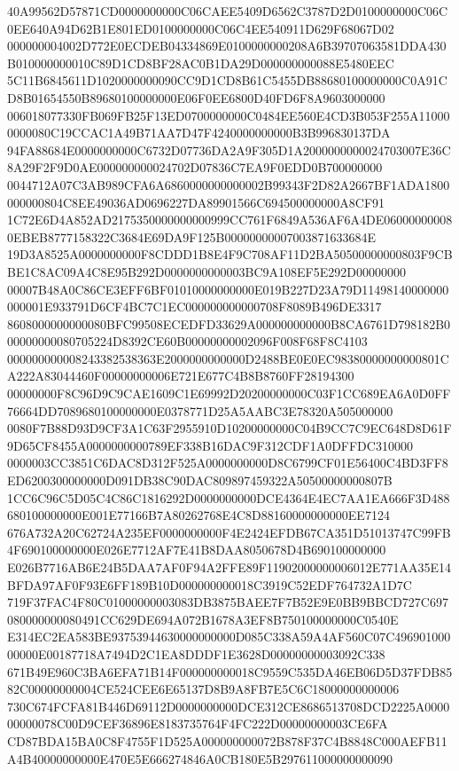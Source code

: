 \documentclass[UTF8,fontset=fandol,zihao=-4,a4paper]{ctexart}
\begin{document}
{{40A99562D57871CD0000000000C06CAEE5409D6562C3787D2D0100000000C06C0EE640A94D62B1E801ED0100000000C06C4EE540911D629F68067D02
000000004002D772E0ECDEB04334869E0100000000208A6B39707063581DDA430B010000000010C89D1CD8BF28AC0B1DA29D000000000088E5480EEC
5C11B6845611D1020000000090CC9D1CD8B61C5455DB88680100000000C0A91CD8B01654550B89680100000000E06F0EE6800D40FD6F8A9603000000
006018077330FB069FB25F13ED0700000000C0484EE560E4CD3B053F255A110000000080C19CCAC1A49B71AA7D47F4240000000000B3B996830137DA
94FA88684E0000000000C6732D07736DA2A9F305D1A2000000000024703007E36C8A29F2F9D0AE000000000024702D07836C7EA9F0EDD0B700000000
0044712A07C3AB989CFA6A6860000000000002B99343F2D82A2667BF1ADA1800000000804C8EE49036AD0696227DA89901566C694500000000A8CF91
1C72E6D4A852AD2175350000000000999CC761F6849A536AF6A4DE060000000080EBEB8777158322C3684E69DA9F125B00000000007003871633684E
19D3A8525A0000000000F8CDDD1B8E4F9C708AF11D2BA50500000000803F9CBBE1C8AC09A4C8E95B292D0000000000003BC9A108EF5E292D00000000
00007B48A0C86CE3EFF6BF01010000000000E019B227D23A79D11498140000000000001E933791D6CF4BC7C1EC000000000000708F8089B496DE3317
8608000000000080BFC99508ECEDFD33629A000000000000B8CA6761D798182B000000000080705224D8392CE60B00000000002096F008F68F8C4103
000000000008243382538363E2000000000000D2488BE0E0EC98380000000000801CA222A83044460F00000000006E721E677C4B8B8760FF28194300
00000000F8C96D9C9CAE1609C1E69992D20200000000C03F1CC689EA6A0D0FF76664DD7089680100000000E0378771D25A5AABC3E78320A505000000
0080F7B88D93D9CF3A1C63F2955910D10200000000C04B9CC7C9EC648D8D61F9D65CF8455A0000000000789EF338B16DAC9F312CDF1A0DFFDC310000
0000003CC3851C6DAC8D312F525A0000000000D8C6799CF01E56400C4BD3FF8ED6200300000000D091DB38C90DAC809897459322A50500000000807B
1CC6C96C5D05C4C86C1816292D0000000000DCE4364E4EC7AA1EA666F3D488680100000000E001E77166B7A80262768E4C8D88160000000000EE7124
676A732A20C62724A235EF0000000000F4E2424EFDB67CA351D51013747C99FB4F690100000000E026E7712AF7E41B8DAA8050678D4B690100000000
E026B7716AB6E24B5DAA7AF0F94A2FFE89F11902000000006012E771AA35E14BFDA97AF0F93E6FF189B10D000000000018C3919C52EDF764732A1D7C
719F37FAC4F80C01000000003083DB3875BAEE7F7B52E9E0BB9BBCD727C697080000000080491CC629DE694A072B1678A3EF8B750100000000C0540E
E314EC2EA583BE93753944630000000000D085C338A59A4AF560C07C49690100000000E00187718A7494D2C1EA8DDDF1E3628D00000000003092C338
671B49E960C3BA6EFA71B14F000000000018C9559C535DA46EB06D5D37FDB8582C00000000004CE524CEE6E65137D8B9A8FB7E5C6C18000000000006
730C674FCFA81B446D69112D0000000000DCE312CE8686513708DCD2225A000000000078C00D9CEF36896E8183735764F4FC222D00000000003CE6FA
CD87BDA15BA0C8F4755F1D525A000000000072B878F37C4B8848C000AEFB11A4B40000000000E470E5E666274846A0CB180E5B297611000000000090
}}
\end{document}
